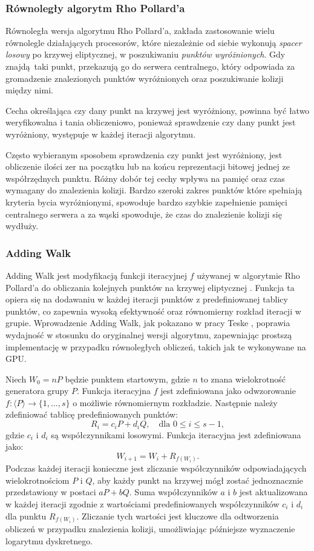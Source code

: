 \subsubsection{Równoległy algorytm Rho Pollard'a}
Równoległa wersja algorytmu Rho Pollard'a, zakłada zastosowanie wielu równolegle działających
procesorów, które niezależnie od siebie wykonują \textit{spacer losowy} po krzywej eliptycznej,
w poszukiwaniu \textit{punktów wyróżnionych}. Gdy znajdą taki punkt, przekazują go do serwera centralnego,
który odpowiada za gromadzenie znalezionych punktów wyróżnionych oraz poszukiwanie kolizji między nimi.
\par
Cecha określająca czy dany punkt na krzywej jest wyróżniony, powinna być łatwo weryfikowalna i tania obliczeniowo,
ponieważ sprawdzenie czy dany punkt jest wyróżniony, występuje w każdej iteracji algorytmu.
\par
Często wybieranym sposobem sprawdzenia czy punkt jest wyróżniony, jest obliczenie ilości zer na początku lub na końcu
reprezentacji bitowej jednej ze współrzędnych punktu. Różny dobór tej cechy wpływa na pamięć oraz
czas wymagany do znalezienia kolizji. Bardzo szeroki zakres punktów które spełniają kryteria bycia wyróżnionymi,
spowoduje bardzo szybkie zapełnienie pamięci centralnego serwera a za wąski spowoduje, że czas do znalezienie kolizji się wydłuży.

\subsubsection{Adding Walk}
Adding Walk jest modyfikacją funkcji iteracyjnej $f$ używanej w algorytmie Rho Pollard’a
do obliczania kolejnych punktów na krzywej eliptycznej \cite{Teske2000}. Funkcja ta opiera się 
na dodawaniu w każdej iteracji punktów z predefiniowanej tablicy punktów, co 
zapewnia wysoką efektywność oraz równomierny rozkład iteracji w grupie. Wprowadzenie 
Adding Walk, jak pokazano w pracy Teske \cite{Teske2000}, poprawia wydajność w 
stosunku do oryginalnej wersji algorytmu, zapewniając prostszą implementację w 
przypadku równoległych obliczeń, takich jak te wykonywane na GPU.

Niech $W_0 = nP$ będzie punktem startowym, gdzie $n$ to znana wielokrotność 
generatora grupy $P$. Funkcja iteracyjna $f$ jest zdefiniowana jako odwzorowanie 
$f: \langle P \rangle \rightarrow \{1, \ldots, s\}$ o możliwie równomiernym 
rozkładzie. Następnie należy zdefiniować tablicę predefiniowanych punktów:
$$
R_i = c_i P + d_i Q, \quad \text{dla } 0 \leq i \leq s - 1,
$$
gdzie $c_i$ i $d_i$ są współczynnikami losowymi. Funkcja iteracyjna jest zdefiniowana 
jako:
$$
W_{i+1} = W_i + R_{f(W_i)}.
$$
Podczas każdej iteracji konieczne jest zliczanie współczynników odpowiadających 
wielokrotnościom $P$ i $Q$, aby każdy punkt na krzywej mógł zostać jednoznacznie 
przedstawiony w postaci $aP + bQ$. Suma współczynników $a$ i $b$ jest aktualizowana 
w każdej iteracji zgodnie z wartościami predefiniowanych współczynników 
$c_i$ i $d_i$ dla punktu $R_{f(W_i)}$. Zliczanie tych wartości jest kluczowe 
dla odtworzenia obliczeń w przypadku znalezienia kolizji, umożliwiając późniejsze 
wyznaczenie logarytmu dyskretnego.

